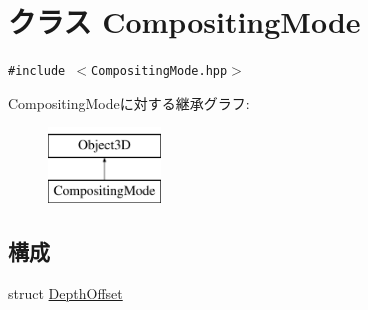 \hypertarget{classm3g_1_1CompositingMode}{
\section{クラス CompositingMode}
\label{classm3g_1_1CompositingMode}
}
{\tt \#include $<$CompositingMode.hpp$>$}

CompositingModeに対する継承グラフ:\begin{figure}[H]
\begin{center}
\leavevmode
\includegraphics[height=2cm]{classm3g_1_1CompositingMode}
\end{center}
\end{figure}
\subsection*{構成}
\begin{CompactItemize}
\item 
struct \hyperlink{structm3g_1_1CompositingMode_1_1DepthOffset}{DepthOffset}
\end{CompactItemize}
